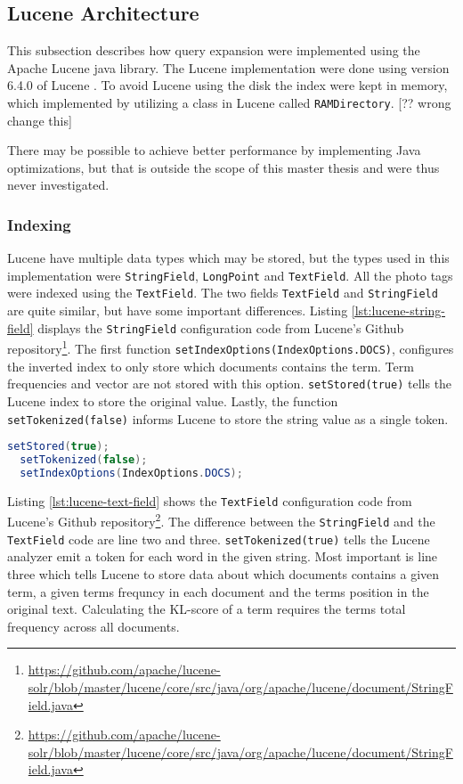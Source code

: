 \subsection{Lucene Architecture}
\label{sec:lucene}
This subsection describes how query expansion were implemented using the Apache Lucene java library.
The Lucene implementation were done using version 6.4.0 of Lucene \cite{lucene-documentation}.
To avoid Lucene using the disk the index were kept in memory,
which implemented by utilizing a class in Lucene called \texttt{RAMDirectory}. [?? wrong change this]

There may be possible to achieve better performance by implementing Java optimizations,
but that is outside the scope of this master thesis and were thus never investigated.

\subsubsection{Indexing}
Lucene have multiple data types which may be stored,
but the types used in this implementation were \texttt{StringField}, \texttt{LongPoint} and \texttt{TextField}.
All the photo tags were indexed using the \texttt{TextField}.
The two fields \texttt{TextField} and \texttt{StringField} are quite similar,
but have some important differences.
Listing \ref{lst:lucene-string-field} displays the \texttt{StringField} configuration code from Lucene's Github repository\footnote{\url{https://github.com/apache/lucene-solr/blob/master/lucene/core/src/java/org/apache/lucene/document/StringField.java}}.
The first function \texttt{setIndexOptions(IndexOptions.DOCS)},
configures the inverted index to only store which documents contains the term.
Term frequencies and vector are not stored with this option.
\texttt{setStored(true)} tells the Lucene index to store the original value.
Lastly, the function \texttt{setTokenized(false)} informs Lucene to store the string value as a single token.

\begin{lstlisting}[language=java, caption={Lucene's \texttt{StringField} index configuration.}, label={lst:lucene-string-field}]
  setStored(true);
  setTokenized(false);
  setIndexOptions(IndexOptions.DOCS);
\end{lstlisting}

Listing \ref{lst:lucene-text-field} shows the \texttt{TextField} configuration code from Lucene's Github repository\footnote{\url{https://github.com/apache/lucene-solr/blob/master/lucene/core/src/java/org/apache/lucene/document/StringField.java}}.
The difference between the \texttt{StringField} and the \texttt{TextField} code are line two and three.
\texttt{setTokenized(true)} tells the Lucene analyzer emit a token for each word in the given string.
Most important is line three which tells Lucene to store data about which documents contains a given term,
a given terms frequncy in each document and the terms position in the original text.
Calculating the KL-score of a term requires the terms total frequency across all documents.

